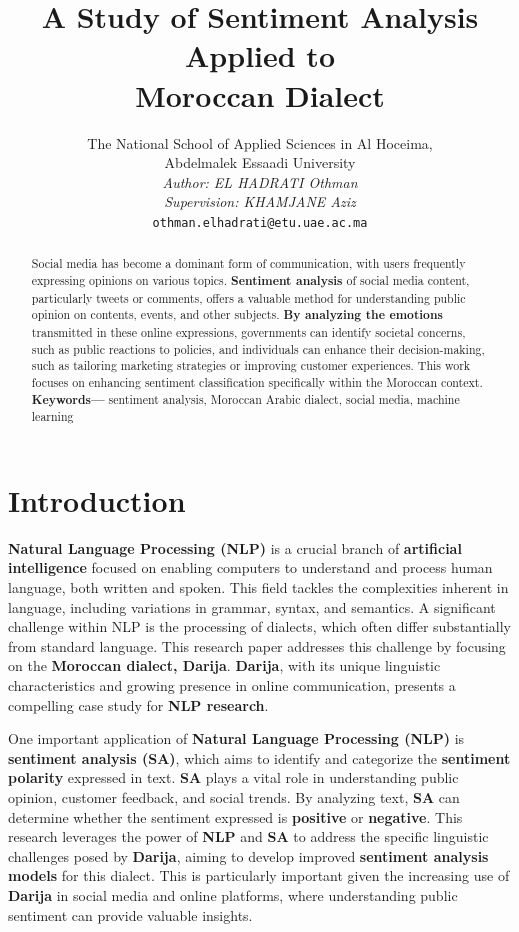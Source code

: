 \documentclass[a4paper,40pt,twocolumn]{article}
\title{\textbf{A Study of Sentiment Analysis Applied to \\Moroccan Dialect}}
\author{The National School of Applied Sciences in Al Hoceima,\\ Abdelmalek Essaadi University\\[5pt]
        \textit{Author: EL HADRATI Othman} \\ 
        \textit{Supervision: KHAMJANE Aziz} \\[5pt]
        { \texttt{othman.elhadrati@etu.uae.ac.ma}}}
\date{}
\begin{document}

\maketitle

\begin{abstract}
Social media has become a dominant form of communication, with users frequently expressing opinions on various topics. \textbf{Sentiment analysis} of social media content, particularly tweets or comments, offers a valuable method for understanding public opinion on contents, events, and other subjects. \textbf{By analyzing the emotions} transmitted in these online expressions, governments can identify societal concerns, such as public reactions to policies, and individuals can enhance their decision-making, such as tailoring marketing strategies or improving customer experiences. This work focuses on enhancing sentiment classification specifically within the Moroccan context.\\

\textbf{Keywords—} sentiment analysis, Moroccan Arabic dialect, social media, machine learning
\end{abstract}



\section{Introduction}

\textbf{Natural Language Processing (NLP)} is a crucial branch of \textbf{artificial intelligence} focused on enabling computers to understand and process human language, both written and spoken. This field tackles the complexities inherent in language, including variations in grammar, syntax, and semantics. A significant challenge within NLP is the processing of dialects, which often differ substantially from standard language. This research paper addresses this challenge by focusing on the \textbf{Moroccan dialect, Darija}. \textbf{Darija}, with its unique linguistic characteristics and growing presence in online communication, presents a compelling case study for \textbf{NLP research}.

One important application of \textbf{Natural Language Processing (NLP)} is \textbf{sentiment analysis (SA)}, which aims to identify and categorize the \textbf{sentiment polarity} expressed in text. \textbf{SA} plays a vital role in understanding public opinion, customer feedback, and social trends. By analyzing text, \textbf{SA} can determine whether the sentiment expressed is \textbf{positive} or \textbf{negative}. This research leverages the power of \textbf{NLP} and \textbf{SA} to address the specific linguistic challenges posed by \textbf{Darija}, aiming to develop improved \textbf{sentiment analysis models} for this dialect. This is particularly important given the increasing use of \textbf{Darija} in social media and online platforms, where understanding public sentiment can provide valuable insights.
\end{document}
